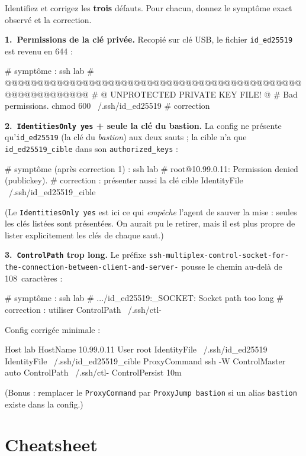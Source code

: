 \documentclass[a4paper,10pt]{exam}
\begin{document}
\begin{questions}
\question Identifiez et corrigez les \textbf{trois} défauts. Pour chacun, donnez le
symptôme exact observé et la correction.
\begin{solution}
\textbf{1.~Permissions de la clé privée.} Recopié sur clé USB, le fichier
\texttt{id\_ed25519} est revenu en 644 :
\begin{bashcode}
# symptôme :
ssh lab
# @@@@@@@@@@@@@@@@@@@@@@@@@@@@@@@@@@@@@@@@@@@@@@@@@@@@@@@@@@@
# @         UNPROTECTED PRIVATE KEY FILE!          @
# Bad permissions.
chmod 600 ~/.ssh/id_ed25519   # correction
\end{bashcode}
\textbf{2.~\texttt{IdentitiesOnly yes} + seule la clé du bastion.} La config ne présente
qu'\texttt{id\_ed25519} (la clé du \emph{bastion}) aux deux sauts ; la cible n'a que
\texttt{id\_ed25519\_cible} dans son \texttt{authorized\_keys} :
\begin{bashcode}
# symptôme (après correction 1) :
ssh lab
# root@10.99.0.11: Permission denied (publickey).
# correction : présenter aussi la clé cible
IdentityFile ~/.ssh/id_ed25519_cible
\end{bashcode}
(Le \texttt{IdentitiesOnly yes} est ici ce qui \emph{empêche} l'agent de sauver la mise :
seules les clés listées sont présentées. On aurait pu le retirer, mais il est plus propre
de lister explicitement les clés de chaque saut.)

\textbf{3.~\texttt{ControlPath} trop long.} Le préfixe
\texttt{ssh-multiplex-control-socket-for-the-connection-between-client-and-server-}
pousse le chemin au-delà de 108~caractères :
\begin{bashcode}
# symptôme :
ssh lab
# .../id_ed25519:_SOCKET: Socket path too long
# correction : utiliser %
ControlPath ~/.ssh/ctl-%
\end{bashcode}
Config corrigée minimale :
\begin{bashcode}
Host lab
    HostName 10.99.0.11
    User root
    IdentityFile ~/.ssh/id_ed25519
    IdentityFile ~/.ssh/id_ed25519_cible
    ProxyCommand ssh -W %
    ControlMaster auto
    ControlPath ~/.ssh/ctl-%
    ControlPersist 10m
\end{bashcode}
(Bonus : remplacer le \texttt{ProxyCommand} par \texttt{ProxyJump bastion} si un alias
\texttt{bastion} existe dans la config.)
\end{solution}
\end{questions}

\section{Cheatsheet}
\end{document}

